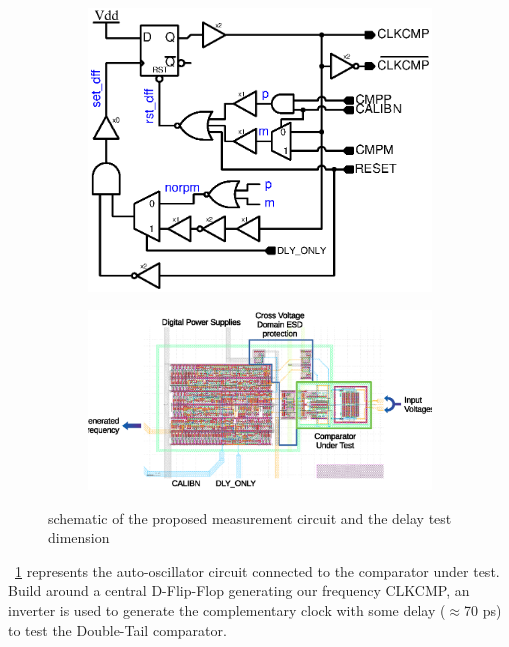 \begin{figure}[htp]
    \centering
    \begin{subfigure}[b]{0.47\linewidth}
	    \includegraphics[width=\textwidth]{Chapter5/Figs/test_delay_comp_new_simp.ps}
    \end{subfigure}
    \begin{subfigure}[b]{0.50\linewidth}
	    \includegraphics[width=\textwidth]{Chapter5/Figs/layout_delay_meas.eps}
    \end{subfigure}
    \caption{schematic of the proposed measurement circuit and the delay test dimension}
	\label{fig:meas_circ_schem}
\end{figure}

\figurename~\ref{fig:meas_circ_schem} represents the auto-oscillator circuit connected to the comparator under test. Build around a central D-Flip-Flop generating our frequency CLKCMP, an inverter is used to generate the complementary clock with some delay (\(\approx\)70 ps) to test the Double-Tail comparator.

